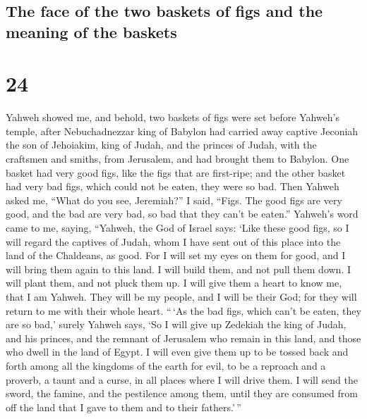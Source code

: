 \hypertarget{the-face-of-the-two-baskets-of-figs-and-the-meaning-of-the-baskets}{%
\subsection{The face of the two baskets of figs and the meaning of the
baskets}\label{the-face-of-the-two-baskets-of-figs-and-the-meaning-of-the-baskets}}

\hypertarget{section-23}{%
\section{24}\label{section-23}}

 Yahweh showed me, and behold, two baskets of figs were
set before Yahweh's temple, after Nebuchadnezzar king of Babylon had
carried away captive Jeconiah the son of Jehoiakim, king of Judah, and
the princes of Judah, with the craftsmen and smiths, from Jerusalem, and
had brought them to Babylon.  One basket had very good
figs, like the figs that are first-ripe; and the other basket had very
bad figs, which could not be eaten, they were so bad. 
Then Yahweh asked me, ``What do you see, Jeremiah?'' I said, ``Figs. The
good figs are very good, and the bad are very bad, so bad that they
can't be eaten.''  Yahweh's word came to me, saying,
 ``Yahweh, the God of Israel says: `Like these good figs,
so I will regard the captives of Judah, whom I have sent out of this
place into the land of the Chaldeans, as good.  For I will
set my eyes on them for good, and I will bring them again to this land.
I will build them, and not pull them down. I will plant them, and not
pluck them up.  I will give them a heart to know me, that
I am Yahweh. They will be my people, and I will be their God; for they
will return to me with their whole heart.  ``\,`As the bad
figs, which can't be eaten, they are so bad,' surely Yahweh says, `So I
will give up Zedekiah the king of Judah, and his princes, and the
remnant of Jerusalem who remain in this land, and those who dwell in the
land of Egypt.  I will even give them up to be tossed back
and forth among all the kingdoms of the earth for evil, to be a reproach
and a proverb, a taunt and a curse, in all places where I will drive
them.  I will send the sword, the famine, and the
pestilence among them, until they are consumed from off the land that I
gave to them and to their fathers.'\,''


